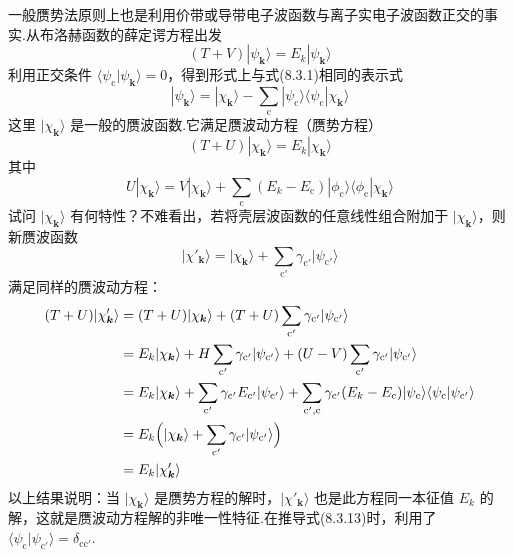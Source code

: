 一般赝势法原则上也是利用价带或导带电子波函数与离子实电子波函数正交的事实.从布洛赫函数的薛定谔方程出发
\begin{equation*}
  (T+V)|\psi_{\boldsymbol{k}}\rangle=E_{k}|\psi_{\boldsymbol{k}}\rangle
\end{equation*}
利用正交条件 $\langle\psi_{\mathrm{c}}|\psi_{\boldsymbol{k}}\rangle=0$，得到形式上与式(8.3.1)相同的表示式
\begin{equation}
  |\psi_{\boldsymbol{k}}\rangle=|\chi_{\boldsymbol{k}}\rangle-\sum_{\mathrm{c}}|\psi_{\mathrm{c}}\rangle\langle\psi_{\mathrm{c}}|\chi_{\boldsymbol{k}}\rangle
\end{equation}
这里 $|\chi_{\boldsymbol{k}}\rangle$ 是一般的赝波函数.它满足赝波动方程（赝势方程）
\begin{equation}
  (T+U)|\chi_{\boldsymbol{k}}\rangle=E_{k}|\chi_{\boldsymbol{k}}\rangle
\end{equation}
其中
\begin{equation}
  U|\chi_{\boldsymbol{k}}\rangle=V|\chi_{\boldsymbol{k}}\rangle
  +\sum_{\mathrm{c}}(E_{k}-E_{\mathrm{c}})|\phi_{\mathrm{c}}\rangle\langle\phi_{\mathrm{c}}|\chi_{\boldsymbol{k}}\rangle
\end{equation}
试问 $|\chi_{\boldsymbol{k}}\rangle$ 有何特性？不难看出，若将壳层波函数的任意线性组合附加于 $|\chi_{\boldsymbol{k}}\rangle$，则新赝波函数
\begin{equation}
  |\chi'_{\boldsymbol{k}}\rangle=|\chi_{\boldsymbol{k}}\rangle+\sum_{\mathrm{c}'}\gamma_{\mathrm{c}'}|\psi_{\mathrm{c}'}\rangle
\end{equation}
满足同样的赝波动方程：
\begin{equation}
\begin{aligned}
  (T+U)|\chi'_{\boldsymbol{k}}\rangle
  &=(T+U)|\chi_{\boldsymbol{k}}\rangle+(T+U)\sum_{\mathrm{c}'}\gamma_{\mathrm{c}'}|\psi_{\mathrm{c}'}\rangle\\
  &=E_{k}|\chi_{\boldsymbol{k}}\rangle+H\sum_{\mathrm{c}'}\gamma_{\mathrm{c}'}|\psi_{\mathrm{c}'}\rangle+(U-V)\sum_{\mathrm{c}'}\gamma_{\mathrm{c}'}|\psi_{\mathrm{c}'}\rangle\\
  &=E_{k}|\chi_{\boldsymbol{k}}\rangle+\sum_{\mathrm{c}'}\gamma_{\mathrm{c}'}E_{\mathrm{c}'}|\psi_{\mathrm{c}'}\rangle
  +\sum_{\mathrm{c}',\mathrm{c}}\gamma_{\mathrm{c}'}(E_{k}-E_{\mathrm{c}})|\psi_{\mathrm{c}}\rangle\langle\psi_{\mathrm{c}}|\psi_{\mathrm{c}'}\rangle\\
  &=E_{k}\Bigl(|\chi_{\boldsymbol{k}}\rangle+\sum_{\mathrm{c}'}\gamma_{\mathrm{c}'}|\psi_{\mathrm{c}'}\rangle\Bigr)\\
  &=E_{k}|\chi'_{\boldsymbol{k}}\rangle
\end{aligned}
\end{equation}
以上结果说明：当 $|\chi_{\boldsymbol{k}}\rangle$ 是赝势方程的解时，$|\chi'_{\boldsymbol{k}}\rangle$ 也是此方程同一本征值 $E_{k}$ 的解，这就是赝波动方程解的非唯一性特征.在推导式(8.3.13)时，利用了 $\langle\psi_{\mathrm{c}}|\psi_{\mathrm{c}'}\rangle=\delta_{\mathrm{cc}'}$.


